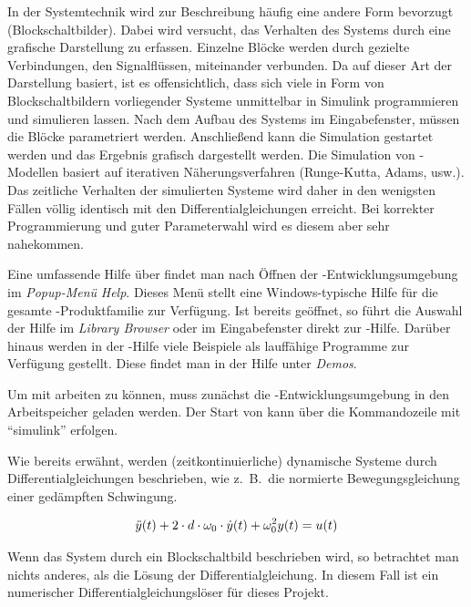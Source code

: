 In der Systemtechnik wird zur Beschreibung häufig eine andere Form bevorzugt (Blockschaltbilder).
Dabei wird versucht, das Verhalten des Systems durch eine grafische Darstellung zu erfassen.
Einzelne Blöcke werden durch gezielte Verbindungen, den Signalflüssen, miteinander verbunden.
Da  auf dieser Art der Darstellung basiert, ist es offensichtlich, dass sich viele in Form von Blockschaltbildern vorliegender Systeme unmittelbar in Simulink programmieren und simulieren lassen.
Nach dem Aufbau des Systems im Eingabefenster, müssen die Blöcke parametriert werden.
Anschließend kann die Simulation gestartet werden und das Ergebnis grafisch dargestellt werden.
Die Simulation von -Modellen basiert auf iterativen Näherungsverfahren (Runge-Kutta, Adams, usw.).
Das zeitliche Verhalten der simulierten Systeme wird daher in den wenigsten Fällen völlig identisch mit den Differentialgleichungen erreicht.
Bei korrekter Programmierung und guter Parameterwahl wird es diesem aber sehr nahekommen.

Eine umfassende Hilfe über  findet man nach Öffnen der -Entwicklungsumgebung im \emph{Popup-Menü} \emph{Help}.
Dieses Menü stellt eine Windows-typische Hilfe für die gesamte -Produktfamilie zur Verfügung.
Ist  bereits geöffnet, so führt die Auswahl der Hilfe im \emph{Library Browser} oder im Eingabefenster direkt zur -Hilfe.
Darüber hinaus werden in der -Hilfe viele Beispiele als lauffähige Programme zur Verfügung gestellt.
Diese findet man in der Hilfe unter \emph{Demos}.

Um mit  arbeiten zu können, muss zunächst die -Entwicklungsumgebung in den Arbeitspeicher geladen werden.
Der Start von  kann über die Kommandozeile mit \enquote{simulink} erfolgen.

Wie bereits erwähnt, werden (zeitkontinuierliche) dynamische Systeme durch Differentialgleichungen beschrieben, wie z.\ B.\ die normierte Bewegungsgleichung einer gedämpften Schwingung.

\begin{align*}
	\ddot{y}(t) + 2\cdot d\cdot \omega_{\mathrm{0}}\cdot \dot{y}(t) + \omega_{\mathrm{0}}^{2} y(t) = u(t)
\end{align*}

Wenn das System durch ein Blockschaltbild beschrieben wird, so betrachtet man nichts anderes, als die Lösung der Differentialgleichung.
In diesem Fall ist  ein numerischer Differentialgleichungslöser für dieses Projekt.

